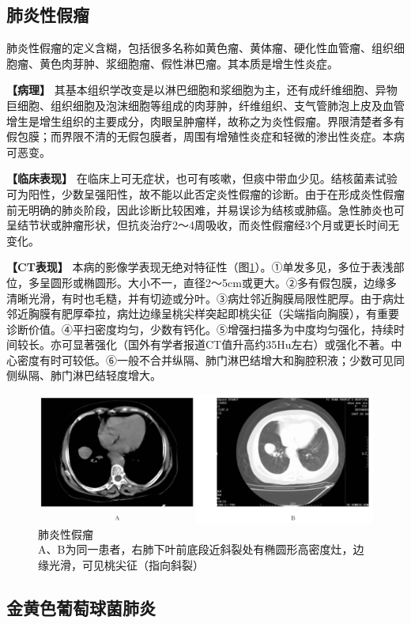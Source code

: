 \subsection{肺炎性假瘤}

肺炎性假瘤的定义含糊，包括很多名称如黄色瘤、黄体瘤、硬化性血管瘤、组织细胞瘤、黄色肉芽肿、浆细胞瘤、假性淋巴瘤。其本质是增生性炎症。

\textbf{【病理】}
其基本组织学改变是以淋巴细胞和浆细胞为主，还有成纤维细胞、异物巨细胞、组织细胞及泡沫细胞等组成的肉芽肿，纤维组织、支气管肺泡上皮及血管增生是增生组织的主要成分，肉眼呈肿瘤样，故称之为炎性假瘤。界限清楚者多有假包膜；而界限不清的无假包膜者，周围有增殖性炎症和轻微的渗出性炎症。本病可恶变。

\textbf{【临床表现】}
在临床上可无症状，也可有咳嗽，但痰中带血少见。结核菌素试验可为阳性，少数呈强阳性，故不能以此否定炎性假瘤的诊断。由于在形成炎性假瘤前无明确的肺炎阶段，因此诊断比较困难，并易误诊为结核或肺癌。急性肺炎也可呈结节状或肿瘤形状，但抗炎治疗2～4周吸收，而炎性假瘤经3个月或更长时间无变化。

\textbf{【CT表现】}
本病的影像学表现无绝对特征性（图\ref{fig9-19}）。①单发多见，多位于表浅部位，多呈圆形或椭圆形。大小不一，直径2～5cm或更大。②多有假包膜，边缘多清晰光滑，有时也毛糙，并有切迹或分叶。③病灶邻近胸膜局限性肥厚。由于病灶邻近胸膜有肥厚牵拉，病灶边缘呈桃尖样突起即桃尖征（尖端指向胸膜），有重要诊断价值。④平扫密度均匀，少数有钙化。⑤增强扫描多为中度均匀强化，持续时间较长。亦可显著强化（国外有学者报道CT值升高约35Hu左右）或强化不著。中心密度有时可较低。⑥一般不合并纵隔、肺门淋巴结增大和胸腔积液；少数可见同侧纵隔、肺门淋巴结轻度增大。

\begin{figure}[!htbp]
 \centering
 \includegraphics[width=.7\textwidth,height=\textheight,keepaspectratio]{./images/Image00204.jpg}
 \captionsetup{justification=centering}
 \caption{肺炎性假瘤\\{\small A、B为同一患者，右肺下叶前底段近斜裂处有椭圆形高密度灶，边缘光滑，可见桃尖征（指向斜裂）}}
 \label{fig9-19}
  \end{figure} 

\subsection{金黄色葡萄球菌肺炎}

